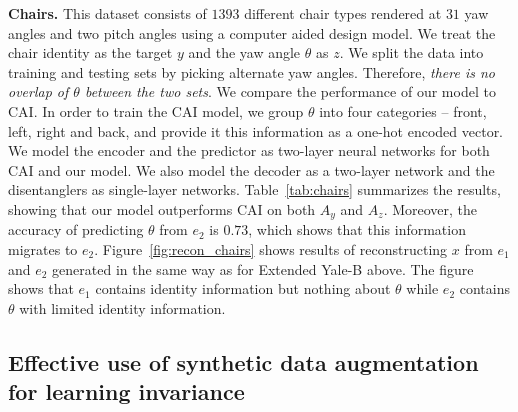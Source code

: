 
\vspace{10pt}
\textbf{Chairs.\quad} This dataset consists of $1393$ different chair types rendered at $31$ yaw angles and two pitch angles using a computer aided design model. We treat the chair identity as the target $y$ and the yaw angle $\theta$ as $z$. We split the data into training and testing sets by picking alternate yaw angles. Therefore, \emph{there is no overlap of $\theta$ between the two sets}. We compare the performance of our model to CAI. In order to train the CAI model, we group $\theta$ into four categories -- front, left, right and back, and provide it this information as a one-hot encoded vector. We model the encoder and the predictor as two-layer neural networks for both CAI and our model. We also model the decoder as a two-layer network and the disentanglers as single-layer networks. Table~\ref{tab:chairs} summarizes the results, showing that our model outperforms CAI on both $A_y$ and $A_z$. Moreover, the accuracy of predicting $\theta$ from $e_2$ is $0.73$, which shows that this information migrates to $e_2$. Figure~\ref{fig:recon_chairs} shows results of reconstructing $x$ from $e_1$ and $e_2$ generated in the same way as for Extended Yale-B above. The figure shows that $e_1$ contains identity information but nothing about $\theta$ while $e_2$ contains $\theta$ with limited identity information.

\subsection{Effective use of synthetic data augmentation for learning invariance}

